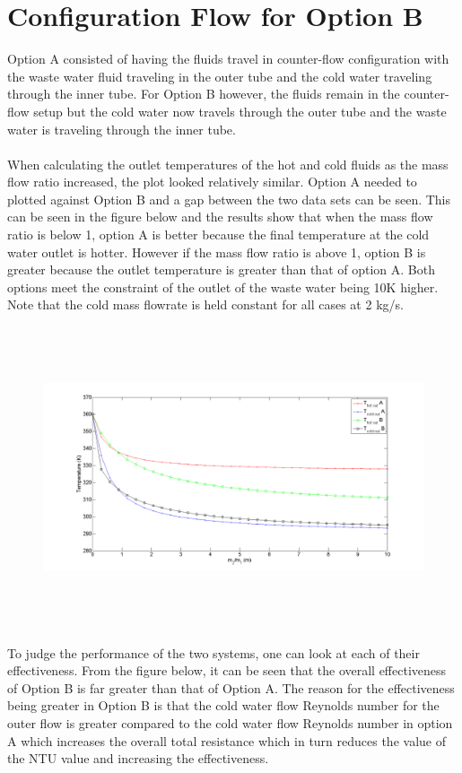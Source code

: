 \section{Configuration Flow for Option B}
Option A consisted of having the fluids travel in counter-flow configuration with the waste water fluid traveling in the outer tube and the cold water traveling through the inner tube. For Option B however, the fluids remain in the counter-flow setup but the cold water now travels through the outer tube and the waste water is traveling through the inner tube. \\ \\
\noindent
When calculating the outlet temperatures of the hot and cold fluids as the mass flow ratio increased, the plot looked relatively similar. Option A needed to plotted against Option B and a gap between the two data sets can be seen. This can be seen in the figure below and the results show that when the mass flow ratio is below 1, option A is better because the final temperature at the cold water outlet is hotter. However if the mass flow ratio is above 1, option B is greater because the outlet temperature is greater than that of option A. Both options meet the constraint of the outlet of the waste water being 10K higher. Note that the cold mass flowrate is held constant for all cases at 2 kg/s.
%
\begin{figure}[H]
    \label{fig:part_4_1}
    \centering
    \includegraphics[height=3.5in]{pictures/part_4_temp_vs_massflow.png}
\end{figure}
%
\noindent
To judge the performance of the two systems, one can look at each of their effectiveness. From the figure below, it can be seen that the overall effectiveness of Option B is far greater than that of Option A. The reason for the effectiveness being greater in Option B is that the cold water flow Reynolds number for the outer flow is greater compared to the cold water flow Reynolds number in option A which increases the overall total resistance which in turn reduces the value of the NTU value and increasing the effectiveness. 
